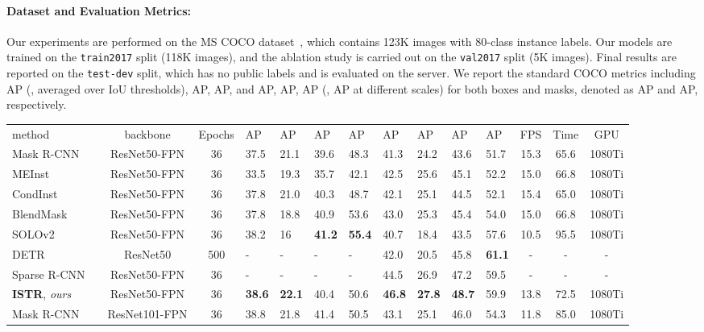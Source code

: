 \documentclass[10pt,twocolumn,letterpaper]{article}
\newlength\savewidth
\newcommand\shline{\noalign{\global\savewidth\arrayrulewidth
 \global\arrayrulewidth 1pt}\hline
\noalign{\global\arrayrulewidth\savewidth}}
\newcommand{\tablestyle}[2]{\setlength{\tabcolsep}{#1}\renewcommand{\arraystretch}{#2}\centering\footnotesize}
\begin{document}
\paragraph{Dataset and Evaluation Metrics:} Our experiments are performed on the MS COCO dataset~\cite{lin2014microsoft}, which contains 123K images with 80-class instance labels.
Our models are trained on the \texttt{train2017} split (118K images), and the ablation study is carried out on the \texttt{val2017} split (5K images).
Final results are reported on the \texttt{test-dev} split, which has no public labels and is evaluated on the server.
We report the standard COCO metrics including AP (\ie, averaged over IoU thresholds), AP, AP, and AP, AP, AP (\ie, AP at different scales) for both boxes and masks, denoted as AP and AP, respectively.
\begin{table*}[t]
\center
\tablestyle{3.8pt}{1.2}\begin{tabular}{l|c|c|x{22}x{22}x{22}x{22}|x{22}x{22}x{22}x{22}|c|c|c}
method & backbone & Epochs & AP & AP & AP & AP & AP & AP & AP & AP & FPS & Time & GPU\\ \shline
Mask R-CNN~\cite{he2017mask} & ResNet50-FPN & 36& 37.5 & 21.1 & 39.6 & 48.3 & 41.3 & 24.2 & 43.6 & 51.7 & 15.3 & 65.6 & 1080Ti \\
MEInst~\cite{zhang2020mask} & ResNet50-FPN &36 & 33.5 & 19.3 & 35.7 & 42.1 & 42.5 & 25.6 & 45.1 & 52.2 & 15.0 & 66.8 & 1080Ti\\
CondInst~\cite{tian2020conditional} & ResNet50-FPN & 36 & 37.8 & 21.0 & 40.3 & 48.7 & 42.1 & 25.1 & 44.5 & 52.1 & 15.4 & 65.0 & 1080Ti\\
BlendMask~\cite{chen2020blendmask} & ResNet50-FPN & 36 & 37.8 & 18.8 & 40.9 & 53.6 & 43.0 & 25.3 & 45.4 & 54.0 & 15.0 & 66.8 & 1080Ti\\
SOLOv2~~\cite{wang2020solov2} & ResNet50-FPN & 36 & 38.2 & 16 & \textbf{41.2} & \textbf{55.4} & 40.7 & 18.4 & 43.5 & 57.6 & 10.5 & 95.5 & 1080Ti\\ \hline
DETR~~\cite{carion2020end} & ResNet50 & 500 & - & - & - & - & 42.0 & 20.5 & 45.8 & \textbf{61.1} & - & - & - \\
Sparse R-CNN~~\cite{sun2020sparse} & ResNet50-FPN & 36 & - & - & - & - & 44.5 & 26.9 & 47.2 & 59.5 & - & - & - \\\hline
\textbf{ISTR}, \emph{ours} & ResNet50-FPN & 36 & \textbf{38.6} & \textbf{22.1} & 40.4 & 50.6 & \textbf{46.8} & \textbf{27.8} & \textbf{48.7} & 59.9 & 13.8 & 72.5 & 1080Ti\\ \hline\hline
Mask R-CNN~\cite{he2017mask} & ResNet101-FPN & 36 & 38.8 & 21.8 & 41.4 & 50.5 & 43.1 & 25.1 & 46.0 & 54.3 & 11.8 & 85.0 & 1080Ti\\

\end{tabular}
\end{table*}
\end{document}
